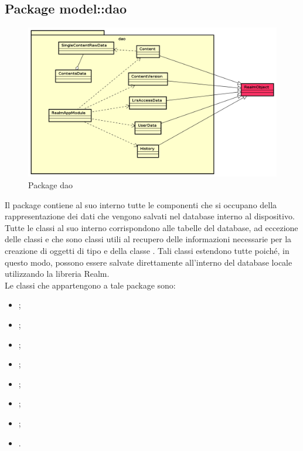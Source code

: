 \documentclass[../Tesi.tex]{subfiles}
\begin{document}
	\subsection{Package model::dao}
		\begin{figure}[H]
			\centering
			\includegraphics[scale=0.5]{images/package_diagrams/dao}
				\caption{Package dao}
		\end{figure}
		Il package  contiene al suo interno tutte le componenti che si occupano della rappresentazione dei dati che vengono salvati nel database interno al dispositivo. Tutte le classi al suo interno corrispondono alle tabelle del database, ad eccezione delle classi  e  che sono classi utili al recupero delle informazioni necessarie per la creazione di oggetti di tipo  e della classe . Tali classi estendono tutte  poiché, in questo modo, possono essere salvate direttamente all'interno del database locale utilizzando la libreria Realm. \\
		Le classi che appartengono a tale package sono:
		\begin{itemize}
			\item {};
			\item {};
			\item {};
			\item {};
			\item {};
			\item {};
			\item {};
			\item {}.
		\end{itemize}
\end{document}
